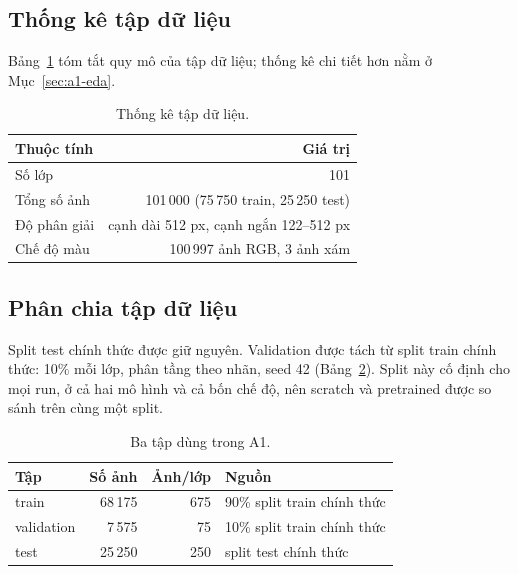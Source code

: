 \documentclass[a4paper,12pt]{article}
\begin{document}
\subsection{Thống kê tập dữ liệu}\label{sec:a1-stats}
Bảng~\ref{tab:a1-overview} tóm tắt quy mô của tập dữ liệu; thống kê chi tiết hơn nằm ở Mục~\ref{sec:a1-eda}.

\begin{table}[!htbp]
    \centering
    \begin{tabular}{lr}
        \toprule
        Thuộc tính   & Giá trị                                \\
        \midrule
        Số lớp       & 101                                    \\
        Tổng số ảnh  & 101\,000 (75\,750 train, 25\,250 test) \\
        Độ phân giải & cạnh dài 512 px, cạnh ngắn 122--512 px \\
        Chế độ màu   & 100\,997 ảnh RGB, 3 ảnh xám            \\
        \bottomrule
    \end{tabular}
    \caption{Thống kê tập dữ liệu.}
    \label{tab:a1-overview}
\end{table}

\subsection{Phân chia tập dữ liệu}\label{sec:a1-split}
Split test chính thức được giữ nguyên. Validation được tách từ split train chính thức: 10\% mỗi lớp, phân tầng theo nhãn, seed 42 (Bảng~\ref{tab:a1-split}). Split này cố định cho mọi run, ở cả hai mô hình và cả bốn chế độ, nên scratch và pretrained được so sánh trên cùng một split.

\begin{table}[!htbp]
    \centering
    \small
    \begin{tabular}{lrrl}
        \toprule
        Tập        & Số ảnh  & Ảnh/lớp & Nguồn                       \\
        \midrule
        train      & 68\,175 & 675     & 90\% split train chính thức \\
        validation & 7\,575  & 75      & 10\% split train chính thức \\
        test       & 25\,250 & 250     & split test chính thức       \\
        \bottomrule
    \end{tabular}
    \caption{Ba tập dùng trong A1.}
    \label{tab:a1-split}
\end{table}
\end{document}
